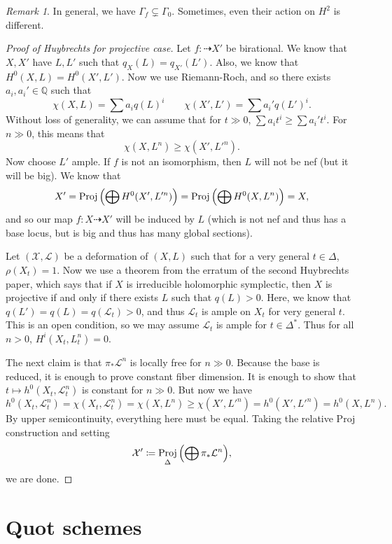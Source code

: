 \documentclass[leqno, openany]{memoir}
\theoremstyle{definition}
\theoremstyle{remark}
\newtheorem{rmk}[thm]{Remark}
\theoremstyle{plain}
\theoremstyle{definition}
\theoremstyle{remark}
\newcommand{\Q}{\mathbb{Q}}
\newcommand{\mc}[1]{\mathcal{#1}}
\DeclareMathOperator{\Proj}{Proj}
\begin{document}
\begin{rmk}
    In general, we have $\Gamma_f \subsetneq \Gamma_0$. Sometimes, even their action on $H^2$ is different.
\end{rmk}

\begin{proof}[Proof of Huybrechts for projective case]
    Let $f \colon \dashrightarrow X'$ be birational. We know that $X, X'$ have $L, L'$ such that $q_X(L) = q_{X'}(L')$. Also, we know that $H^0(X, L) = H^0(X', L')$. Now we use Riemann-Roch, and so there exists $a_i, a_i' \in \Q$ such that
    \[ \chi(X, L) = \sum a_i q(L)^i \qquad \chi(X', L') = \sum a_i' q(L')^i. \]
    Without loss of generality, we can assume that for $t \gg 0$, $\sum a_i t^i \geq \sum a_i' t^i$. For $n \gg 0$, this means that 
    \[ \chi(X, L^n) \geq \chi(X', L'^n). \]
    Now choose $L'$ ample. If $f$ is not an isomorphism, then $L$ will not be nef (but it will be big). We know that
    \[ X' = \Proj \qty(\bigoplus H^0(X', L'^n)) = \Proj \qty(\bigoplus H^0(X, L^n)) = X, \]
    and so our map $f \colon X \dashrightarrow X'$ will be induced by $L$ (which is not nef and thus has a base locus, but is big and thus has many global sections).

    Let $(\mc{X}, \mc{L})$ be a deformation of $(X, L)$ such that for a very general $t \in \Delta$, $\rho(X_t) = 1$. Now we use a theorem from the erratum of the second Huybrechts paper, which says that if $X$ is irreducible holomorphic symplectic, then $X$ is projective if and only if there exists $L$ such that $q(L) > 0$. Here, we know that $q(L') = q(L) = q(\mc{L}_t) > 0$, and thus $\mc{L}_t$ is ample on $X_t$ for very general $t$. This is an open condition, so we may assume $\mc{L}_t$ is ample for $t \in \Delta^*$. Thus for all $n > 0$, $H^i(X_t, L_t^n) = 0$.

    The next claim is that $\pi_* \mc{L}^n$ is locally free for $n \gg 0$. Because the base is reduced, it is enough to prove constant fiber dimension. It is enough to show that $t \mapsto h^0(X_t, \mc{L}_t^n)$ is constant for $n \gg 0$. But now we have
    \[ h^0(X_t, \mc{L}_t^n) = \chi(X_t, \mc{L}_t^n) = \chi(X, L^n) \geq \chi(X', L'^n) = h^0(X', L'^n) = h^0(X, L^n). \]
    By upper semicontinuity, everything here must be equal. Taking the relative Proj construction and setting
    \[ \mc{X}' \coloneqq \Proj_{\Delta} \qty(\bigoplus \pi_* \mc{L}^n), \]
    we are done.
\end{proof}

\section{Quot schemes}%
\label{sec:quot_schemes}
\end{document}
